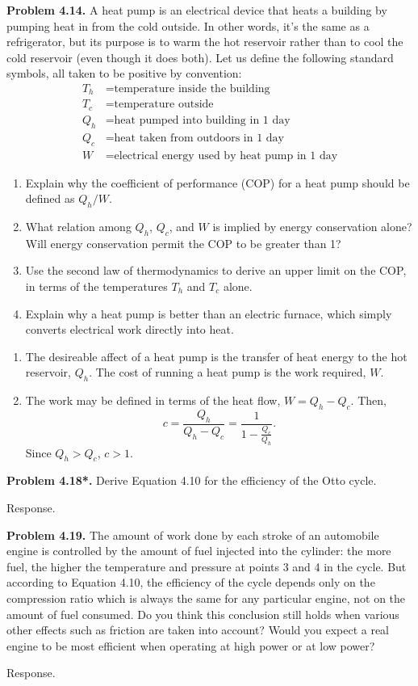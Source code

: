 \documentclass[a4paper, 12pt]{config/homework}
\begin{document}
\pagebreak\noindent
\textbf{Problem 4.14.} A heat pump is an electrical device that heats a building by pumping heat in from the cold outside. In other words, it's the same as a refrigerator, but its purpose is to warm the hot reservoir rather than to cool the cold reservoir (even though it does both). Let us define the following standard symbols, all taken to be positive by convention:
\begin{align*}
   T_h &= \text{temperature inside the building}
\\ T_c &= \text{temperature outside}
\\ Q_h &= \text{heat pumped into building in 1 day}
\\ Q_c &= \text{heat taken from outdoors in 1 day}
\\ W   &= \text{electrical energy used by heat pump in 1 day}
\end{align*}
\begin{enumerate}[label=\textbf{(\alph*)}]
\item Explain why the coefficient of performance (COP) for a heat pump should be defined as \(Q_h/W\).
\item What relation among \(Q_h\), \(Q_c\), and \(W\) is implied by energy conservation alone? Will energy conservation permit the COP to be greater than 1?
\item Use the second law of thermodynamics to derive an upper limit on the COP, in terms of the temperatures \(T_h\) and \(T_c\) alone.
\item Explain why a heat pump is better than an electric furnace, which simply converts electrical work directly into heat.
\end{enumerate}
\begin{enumerate}[label=\textbf{(\alph*)}]
\bigskip
\item The desireable affect of a heat pump is the transfer of heat energy to the hot reservoir, \(Q_h\). The cost of running a heat pump is the work required, \(W\).
\bigskip
\item The work may be defined in terms of the heat flow, \(W=Q_h - Q_c\). Then,
\[c = \frac{Q_h}{Q_h - Q_c} = \frac{1}{1 - \frac{Q_c}{Q_h}}.\]
Since \(Q_h > Q_c\), \(c > 1\).
\end{enumerate}

\pagebreak\noindent
\textbf{Problem 4.18*.} Derive Equation 4.10 for the efficiency of the Otto cycle.

\bigskip\noindent
Response.

\pagebreak\noindent
\textbf{Problem 4.19.} The amount of work done by each stroke of an automobile engine is controlled by the amount of fuel injected into the cylinder: the more fuel, the higher the temperature and pressure at points 3 and 4 in the cycle. But according to Equation 4.10, the efficiency of the cycle depends only on the compression ratio which is always the same for any particular engine, not on the amount of fuel consumed. Do you think this conclusion still holds when various other effects such as friction are taken into account? Would you expect a real engine to be most efficient when operating at high power or at low power?

\bigskip\noindent
Response.
\end{document}
